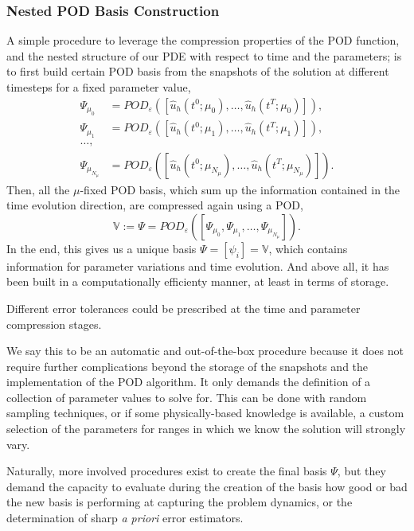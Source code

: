 \documentclass[../1_heat_equation.tex]{subfiles}
\newcommand{\rbV}{\ensuremath{\mathbb{V}}}
\begin{document}
\subsubsection{Nested POD Basis Construction}
\label{sec:1d_rom_heat_equation_basis_construction_nested}
A simple procedure to leverage the compression properties of the POD function, and the nested structure of our PDE with respect to time and the parameters; is to first build certain POD basis from the snapshots of the solution at different timesteps for a fixed parameter value,
\begin{align*}
    \Psi_{\mu_0} &= POD_{\varepsilon}\left(\left[\hat{u}_h(t^0; \mu_0), \ldots, \hat{u}_h(t^T; \mu_0)\right]\right), \\
    \Psi_{\mu_1} &= POD_{\varepsilon}\left(\left[\hat{u}_h(t^0; \mu_1), \ldots, \hat{u}_h(t^T; \mu_1)\right]\right), \\  
    \ldots, \\
    \Psi_{\mu_{N_{\mu}}} &= POD_{\varepsilon}\left(\left[\hat{u}_h(t^0; \mu_{N_{\mu}}), \ldots, \hat{u}_h(t^T; \mu_{N_{\mu}})\right]\right).
\end{align*}
Then, all the $\mu$-fixed POD basis, which sum up the information contained in the time evolution direction, are compressed again using a POD,
\begin{equation*}
    \rbV := \Psi = POD_{\varepsilon} \left(\left[\Psi_{\mu_0}, \Psi_{\mu_1}, \ldots, \Psi_{\mu_{N_{\mu}}}\right]\right).
\end{equation*}
In the end, this gives us a unique basis $\Psi = [\psi_i] = \rbV$, which contains information for parameter variations and time evolution.
And above all, it has been built in a computationally efficienty manner, at least in terms of storage.

Different error tolerances could be prescribed at the time and parameter compression stages.

We say this to be an automatic and out-of-the-box procedure because it does not require further complications beyond the storage of the snapshots and the implementation of the POD algorithm.
It only demands the definition of a collection of parameter values to solve for.
This can be done with random sampling techniques, or if some physically-based knowledge is available, a custom selection of the parameters for ranges in which we know the solution will strongly vary.

Naturally, more involved procedures exist to create the final basis $\Psi$, but they demand the capacity to evaluate during the creation of the basis how good or bad the new basis is performing at capturing the problem dynamics, or the determination of sharp \emph{a priori} error estimators.
\end{document}
